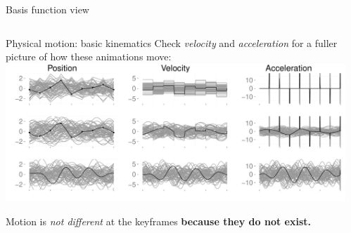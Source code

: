 \documentclass[final,t]{beamer}\usepackage[]{graphicx}\usepackage[]{color}
\makeatletter
\def\maxwidth{ %
  \ifdim\Gin@nat@width>\linewidth
    \linewidth
  \else
    \Gin@nat@width
  \fi
}
\newenvironment{knitrout}{}{} %
\newcommand{\cmark}{\ding{51}}%
\makeatother
\begin{document}
\begin{frame}[fragile]
\begin{columns}[T,onlytextwidth]
\begin{column}{.325\linewidth}
{\begin{block}{Basis function view}
\begin{table}
\begin{tabular}{|l|c|c|c|}
\begin{knitrout}
\end{knitrout}

            & {\Huge \color{green}{\cmark}} & {\Huge \color{green}{\cmark}} &
            {\Huge \color{green}{\cmark}} \\
            \hline
          \end{tabular}
        \end{table}

      \end{block}

      \vfill

      \begin{block}{Physical motion: basic kinematics}
        {\small Check \textit{velocity} and \textit{acceleration} for a
        fuller picture of how these animations move:} \\
\begin{knitrout}
\color{fgcolor}
\includegraphics[width=\maxwidth]{figure/kinematics} 

\end{knitrout}

        Motion is \textit{not different} at the keyframes
        \textbf{because they do not exist.}
      \end{block}

      }%
    \end{column}

    \begin{column}{.325\linewidth}


\end{column}
\end{columns}
\end{frame}
\end{document}
